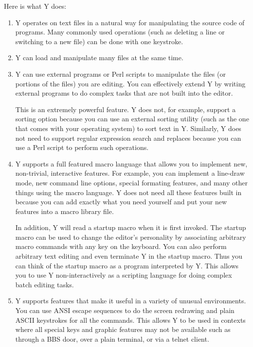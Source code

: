Here is what Y does:

\begin{enumerate}

\item Y operates on text files in a natural way for manipulating the source code of programs.
  Many commonly used operations (such as deleting a line or switching to a new file) can be done
  with one keystroke.

\item Y can load and manipulate many files at the same time.

\item Y can use external programs or Perl scripts to manipulate the files (or portions of the
  files) you are editing. You can effectively extend Y by writing external programs to do
  complex tasks that are not built into the editor.

  This is an extremely powerful feature. Y does not, for example, support a sorting option
  because you can use an external sorting utility (such as the one that comes with your
  operating system) to sort text in Y. Similarly, Y does not need to support regular expression
  search and replaces because you can use a Perl script to perform such operations.

\item Y supports a full featured macro language that allows you to implement new, non-trivial,
  interactive features. For example, you can implement a line-draw mode, new command line
  options, special formating features, and many other things using the macro language. Y does
  not need all these features built in because you can add exactly what you need yourself and
  put your new features into a macro library file.

  In addition, Y will read a startup macro when it is first invoked. The startup macro can be
  used to change the editor's personality by associating arbitrary macro commands with any key
  on the keyboard. You can also perform arbitrary text editing and even terminate Y in the
  startup macro. Thus you can think of the startup macro as a program interpreted by Y. This
  allows you to use Y non-interactively as a scripting language for doing complex batch editing
  tasks.

\item Y supports features that make it useful in a variety of unusual environments. You can use
  ANSI escape sequences to do the screen redrawing and plain ASCII keystrokes for all the
  commands. This allows Y to be used in contexts where all special keys and graphic features may
  not be available such as through a BBS door, over a plain terminal, or via a telnet client.

\end{enumerate}

